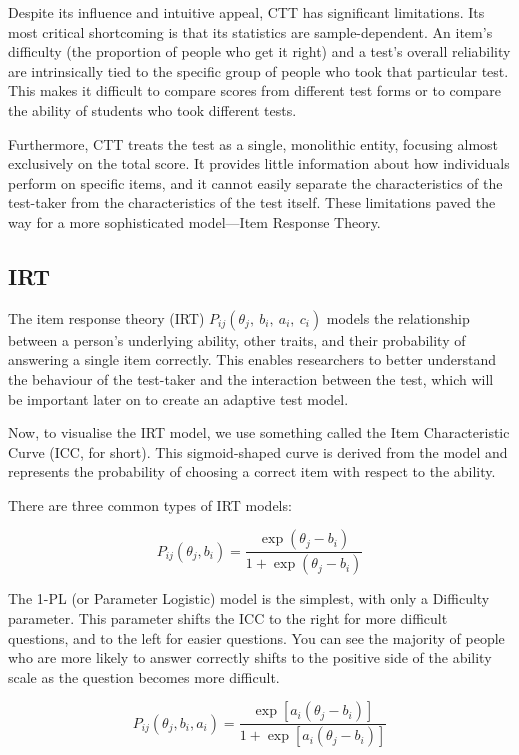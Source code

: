 \documentclass{article}
\begin{document}
Despite its influence and intuitive appeal, CTT has significant limitations. Its most critical shortcoming is that its statistics are sample-dependent. An item's difficulty (the proportion of people who get it right) and a test's overall reliability are intrinsically tied to the specific group of people who took that particular test. This makes it difficult to compare scores from different test forms or to compare the ability of students who took different tests. 

Furthermore, CTT treats the test as a single, monolithic entity, focusing almost exclusively on the total score. It provides little information about how individuals perform on specific items, and it cannot easily separate the characteristics of the test-taker from the characteristics of the test itself. These limitations paved the way for a more sophisticated model—Item Response Theory.

\subsection*{IRT}

The item response theory (IRT) $P_{ij}\left(\theta_j,\ b_i,\ a_i,\ c_i\right)$ models the relationship between a person's underlying ability, other traits, and their probability of answering a single item correctly. This enables researchers to better understand the behaviour of the test-taker and the interaction between the test, which will be important later on to create an adaptive test model.

Now, to visualise the IRT model, we use something called the Item Characteristic Curve (ICC, for short). This sigmoid-shaped curve is derived from the model and represents the probability of choosing a correct item with respect to the ability. 

There are three common types of IRT models:

\[
P_{ij}\left(\theta_j,b_i\right)=\frac{\exp(\theta_j-b_i)}{1+\exp(\theta_j-b_i)}
\]

The 1-PL (or Parameter Logistic) model is the simplest, with only a Difficulty parameter. This parameter shifts the ICC to the right for more difficult questions, and to the left for easier questions. You can see the majority of people who are more likely to answer correctly shifts to the positive side of the ability scale as the question becomes more difficult.

\[
P_{ij}\left(\theta_j,b_i,a_i\right)=\frac{\exp\left[a_i(\theta_j-b_i)\right]}{1+\exp\left[a_i(\theta_j-b_i)\right]}
\]
\end{document}
